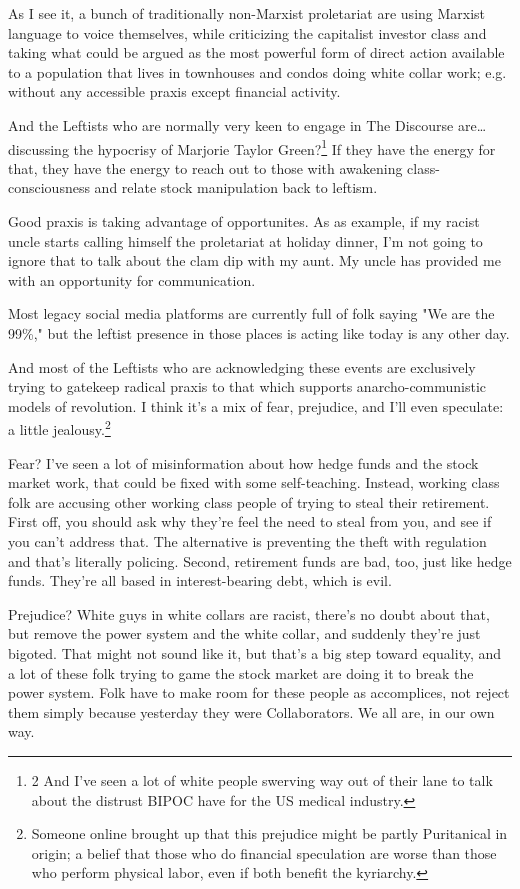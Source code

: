 \documentclass[11pt]{article}
\begin{document}
\begin{itemize}
As I see it, a bunch of traditionally non-Marxist proletariat are using Marxist language to voice themselves, while criticizing the capitalist investor class and taking what could be argued as the most powerful form of direct action available to a population that lives in townhouses and condos doing white collar work; e.g. without any accessible praxis except financial activity.

And the Leftists who are normally very keen to engage in The Discourse are… discussing the hypocrisy of Marjorie Taylor Green?\footnote{2 And I've seen a lot of white people swerving way out of their lane to talk about the distrust BIPOC have for the US medical industry.} If they have the energy for that, they have the energy to reach out to those with awakening class-consciousness and relate stock manipulation back to leftism.

Good praxis is taking advantage of opportunites. As as example, if my racist uncle starts calling himself the proletariat at holiday dinner, I'm not going to ignore that to talk about the clam dip with my aunt. My uncle has provided me with an opportunity for communication.

Most legacy social media platforms are currently full of folk saying "We are the 99\%," but the leftist presence in those places is acting like today is any other day.

And most of the Leftists who are acknowledging these events are exclusively trying to gatekeep radical praxis to that which supports anarcho-communistic models of revolution. I think it's a mix of fear, prejudice, and I'll even speculate: a little jealousy.\footnote{Someone online brought up that this prejudice might be partly Puritanical in origin; a belief that those who do financial speculation are worse than those who perform physical labor, even if both benefit the kyriarchy.}

Fear? I've seen a lot of misinformation about how hedge funds and the stock market work, that could be fixed with some self-teaching. Instead, working class folk are accusing other working class people of trying to steal their retirement. First off, you should ask why they're feel the need to steal from you, and see if you can't address that. The alternative is preventing the theft with regulation and that's literally policing. Second, retirement funds are bad, too, just like hedge funds. They're all based in interest-bearing debt, which is evil.

Prejudice? White guys in white collars are racist, there's no doubt about that, but remove the power system and the white collar, and suddenly they're just bigoted. That might not sound like it, but that's a big step toward equality, and a lot of these folk trying to game the stock market are doing it to break the power system. Folk have to make room for these people as accomplices, not reject them simply because yesterday they were Collaborators. We all are, in our own way.


\end{itemize}
\end{document}
